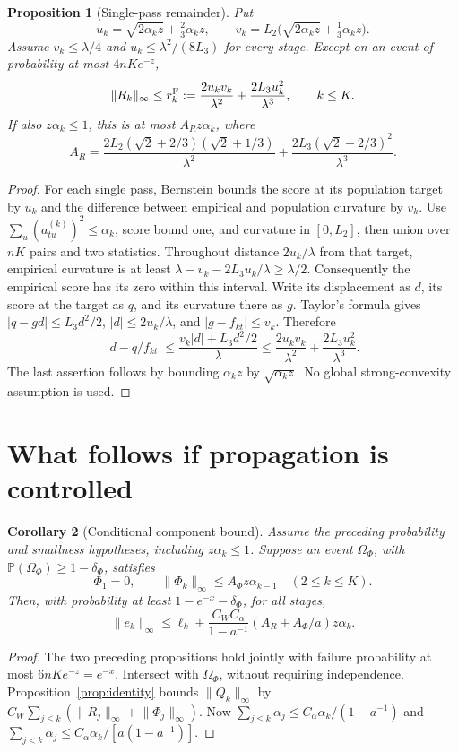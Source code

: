\documentclass[11pt]{article}
\newcommand{\Prob}{\mathbb P}
\newcommand{\norm}[1]{\lVert #1\rVert}
\newtheorem{proposition}{Proposition}
\newtheorem{corollary}[proposition]{Corollary}
\theoremstyle{remark}
\begin{document}
\begin{proposition}[Single-pass remainder]\label{prop:fisher}
Put
\[
 u_k=\sqrt{2\alpha_kz}+\tfrac23\alpha_kz,\qquad
 v_k=L_2\bigl(\sqrt{2\alpha_kz}+\tfrac13\alpha_kz\bigr).
\]
Assume \(v_k\le\lambda/4\) and \(u_k\le\lambda^2/(8L_3)\) for every
stage. Except on an event of probability at most \(4nKe^{-z}\),
\[
 \norm{R_k}_\infty\le r_k^{\rm F}:=
 \frac{2u_kv_k}{\lambda^2}+\frac{2L_3u_k^2}{\lambda^3},\qquad k\le K.
\]
If also \(z\alpha_k\le1\), this is at most \(A_Rz\alpha_k\), where
\[
 A_R=\frac{2L_2(\sqrt2+2/3)(\sqrt2+1/3)}{\lambda^2}
       +\frac{2L_3(\sqrt2+2/3)^2}{\lambda^3}.
\]
\end{proposition}
\begin{proof}
For each single pass, Bernstein bounds the score at its population target
by \(u_k\) and the difference between empirical and population curvature
by \(v_k\). Use \(\sum_u(a^{(k)}_{tu})^2\le\alpha_k\), score bound one,
and curvature in \([0,L_2]\), then union over \(nK\) pairs and two statistics.
Throughout distance \(2u_k/\lambda\) from that target, empirical curvature
is at least \(\lambda-v_k-2L_3u_k/\lambda\ge\lambda/2\).
Consequently the empirical score has its zero within this interval.
Write its displacement as \(d\), its score at the target as \(q\), and its
curvature there as \(g\). Taylor's formula gives
\(|q-gd|\le L_3d^2/2\), \(|d|\le2u_k/\lambda\), and \(|g-f_{kt}|\le v_k\).
Therefore
\[
 |d-q/f_{kt}|\le\frac{v_k|d|+L_3d^2/2}{\lambda}
 \le\frac{2u_kv_k}{\lambda^2}+\frac{2L_3u_k^2}{\lambda^3}.
\]
The last assertion follows by bounding \(\alpha_kz\) by
\(\sqrt{\alpha_kz}\). No global strong-convexity assumption is used.
\end{proof}

\section{What follows if propagation is controlled}
\begin{corollary}[Conditional component bound]\label{cor:conditional}
Assume the preceding probability and smallness hypotheses, including
\(z\alpha_k\le1\). Suppose an event \(\Omega_\Phi\), with
\(\Prob(\Omega_\Phi)\ge1-\delta_\Phi\), satisfies
\[
 \Phi_1=0,\qquad \norm{\Phi_k}_\infty\le A_\Phi z\alpha_{k-1}\quad(2\le k\le K).
\]
Then, with probability at least \(1-e^{-x}-\delta_\Phi\), for all stages,
\[
 \norm{e_k}_\infty\le\ell_k+
 \frac{C_WC_\alpha}{1-a^{-1}}(A_R+A_\Phi/a)z\alpha_k.
\]
\end{corollary}
\begin{proof}
The two preceding propositions hold jointly with failure probability at
most \(6nKe^{-z}=e^{-x}\). Intersect with \(\Omega_\Phi\), without requiring
independence. Proposition~\ref{prop:identity} bounds \(\norm{Q_k}_\infty\) by
\(C_W\sum_{j\le k}(\norm{R_j}_\infty+\norm{\Phi_j}_\infty)\).
Now \(\sum_{j\le k}\alpha_j\le C_\alpha\alpha_k/(1-a^{-1})\) and
\(\sum_{j<k}\alpha_j\le C_\alpha\alpha_k/[a(1-a^{-1})]\).
\end{proof}
\end{document}
